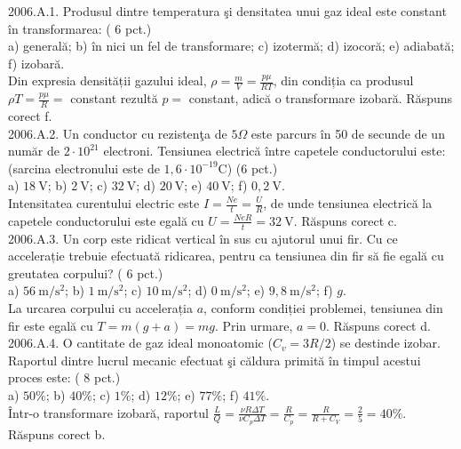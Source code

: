 
2006.A.1. Produsul dintre temperatura şi densitatea unui gaz ideal este constant în transformarea: ( 6 pct.)\\ a) generală; b) în nici un fel de transformare; c) izotermă; d) izocoră; e) adiabată; f) izobară.\\ Din expresia densității gazului ideal, $\rho=\frac{m}{V}=\frac{p \mu}{R T}$, din condiția ca produsul $\rho T=\frac{p \mu}{R}=$ constant rezultă $p=$ constant, adică o transformare izobară. Răspuns corect f.\\

2006.A.2. Un conductor cu rezistenţa de $5 \Omega$ este parcurs în 50 de secunde de un număr de $2 \cdot 10^{21}$ electroni. Tensiunea electrică între capetele conductorului este: (sarcina electronului este de $1,6 \cdot 10^{-19} \mathrm{C}$) (6 pct.)\\ a) $18 \mathrm{~V}$; b) $2 \mathrm{~V}$; c) $32 \mathrm{~V}$; d) $20 \mathrm{~V}$; e) $40 \mathrm{~V}$; f) $0,2 \mathrm{~V}$.\\ Intensitatea curentului electric este $I=\frac{N e}{t}=\frac{U}{R}$, de unde tensiunea electrică la capetele conductorului este egală cu $U=\frac{N e R}{t}=32 \mathrm{~V}$. Răspuns corect c.\\

2006.A.3. Un corp este ridicat vertical în sus cu ajutorul unui fir. Cu ce accelerație trebuie efectuată ridicarea, pentru ca tensiunea din fir să fie egală cu greutatea corpului? ( 6 pct.)\\ a) $56 \mathrm{~m} / \mathrm{s}^{2}$; b) $1 \mathrm{~m} / \mathrm{s}^{2}$; c) $10 \mathrm{~m} / \mathrm{s}^{2}$; d) $0 \mathrm{~m} / \mathrm{s}^{2}$; e) $9,8 \mathrm{~m} / \mathrm{s}^{2}$; f) $g$.\\ La urcarea corpului cu accelerația $a$, conform condiției problemei, tensiunea din fir este egală cu $T=m(g+a)=m g$. Prin urmare, $a=0$. Răspuns corect d.\\

2006.A.4. O cantitate de gaz ideal monoatomic ($C_{v}=3 R / 2$) se destinde izobar. Raportul dintre lucrul mecanic efectuat şi căldura primită în timpul acestui proces este: ( 8 pct.)\\ a) $50 \%$; b) $40 \%$; c) $1 \%$; d) $12 \%$; e) $77 \%$; f) $41 \%$.\\ Într-o transformare izobară, raportul $\frac{L}{Q}=\frac{\nu R \Delta T}{\nu C_{p} \Delta T}=\frac{R}{C_{p}}=\frac{R}{R+C_{V}}=\frac{2}{5}=40 \%$. Răspuns corect b.\\

